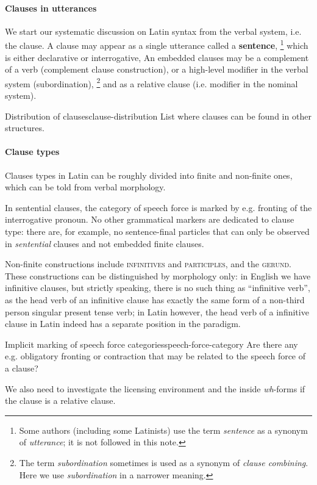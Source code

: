 \documentclass[a4paper, oneside, 12pt]{report}
\newcommand*{\concept}[1]{\textbf{#1}}
\newcommand*{\term}[1]{\emph{#1}}
\newcommand{\form}[1]{\emph{#1}}
\newcommand*{\category}[1]{\textsc{#1}}
\begin{document}
\paragraph*{Clauses in utterances}\label{sec:grammatical.clause.introduction.utterance}
We start our systematic discussion on Latin syntax from the verbal system, i.e. the clause. 
A clause may appear as a single utterance called a \concept{sentence},%
\footnote{
    Some authors (including some Latinists) use the term \term{sentence}
    as a synonym of \term{utterance};
    it is not followed in this note.
}
which is either declarative or interrogative,
An embedded clauses may be a complement of a verb (complement clause construction),
or a high-level modifier in the verbal system (subordination),%
\footnote{
    The term \term{subordination} sometimes is used as a synonym of \term{clause combining}.
    Here we use \term{subordination} in a narrower meaning.
}
and as a relative clause 
(i.e. modifier in the nominal system).

\begin{todobox}{Distribution of clauses}{clause-distribution}
    List where clauses can be found in other structures.
\end{todobox}

\paragraph*{Clause types}
Clauses types in Latin can be roughly divided into finite and non-finite ones,
which can be told from verbal morphology.

In sentential clauses, 
the category of speech force is marked by e.g. fronting of the interrogative pronoun.
No other grammatical markers are dedicated to clause type:
there are, for example, no sentence-final particles 
that can only be observed in \emph{sentential} clauses
and not embedded finite clauses.

Non-finite constructions include \category{infinitives} and \category{participles}, and the \category{gerund}.
These constructions can be distinguished by morphology only:
in English we have infinitive clauses,
but strictly speaking, there is no such thing as ``infinitive verb'',
as the head verb of an infinitive clause 
has exactly the same form of a non-third person singular present tense verb;
in Latin however, the head verb of a infinitive clause in Latin 
indeed has a separate position in the paradigm.

\begin{todobox}{Implicit marking of speech force categories}{speech-force-category}
    Are there any e.g. obligatory fronting or contraction that may be related to the speech force of a clause?
    
    We also need to investigate the licensing environment
    and the inside \form{wh}-forms if the clause is a relative clause.
\end{todobox}
\end{document}

